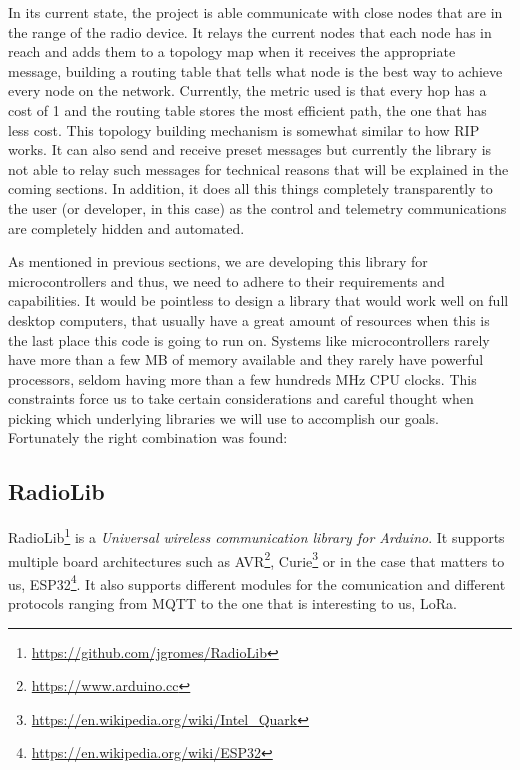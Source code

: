 In its current state, the project is able communicate with close nodes that are in the range of the radio device. It relays the current nodes that each node has in reach and adds them to a topology map when it receives the appropriate message, building a routing table that tells what node is the best way to achieve every node on the network. Currently, the metric used is that every hop has a cost of 1 and the routing table stores the most efficient path, the one that has less cost. This topology building mechanism is somewhat similar to how RIP works. It can also send and receive preset messages but currently the library is not able to relay such messages for technical reasons that will be explained in the coming sections. %
In addition, it does all this things completely transparently to the user (or developer, in this case) as the control and telemetry communications are completely hidden and automated.

As mentioned in previous sections, we are developing this library for microcontrollers and thus, we need to adhere to their requirements and capabilities. It would be pointless to design a library that would work well on full desktop computers, that usually have a great amount of resources when this is the last place this code is going to run on. Systems like microcontrollers rarely have more than a few MB of memory available and they rarely have powerful processors, seldom having more than a few hundreds MHz CPU clocks. %
This constraints force us to take certain considerations and careful thought when picking which underlying libraries we will use to accomplish our goals. Fortunately the right combination was found:
\subsection{RadioLib}
RadioLib\footnote{\url{https://github.com/jgromes/RadioLib}} is a \textit{Universal wireless communication library for Arduino}. It supports multiple board architectures such as AVR\footnote{\url{https://www.arduino.cc}}, Curie\footnote{\url{https://en.wikipedia.org/wiki/Intel_Quark}} or in the case that matters to us, ESP32\footnote{\url{https://en.wikipedia.org/wiki/ESP32}}. It also supports different modules for the comunication and different protocols ranging from MQTT to the one that is interesting to us, LoRa.

